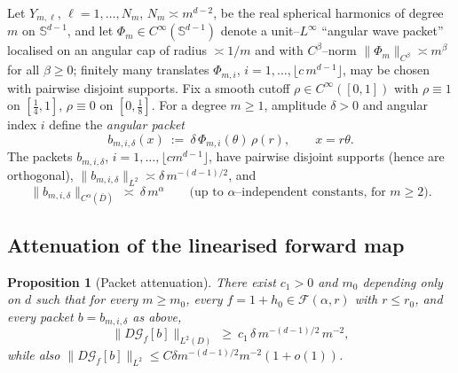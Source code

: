 \documentclass[11pt]{article}
\newtheorem{proposition}[theorem]{Proposition}
\newcommand{\1}{\mathbf{1}}
\newcommand{\norm}[1]{\lVert #1\rVert}
\newcommand{\Gf}{\mathcal{G}}
\newcommand{\F}{\mathcal{F}}
\begin{document}
Let $Y_{m,\ell}$, $\ell=1,\dots,N_m$, $N_m\asymp m^{d-2}$, be the real spherical
harmonics of degree $m$ on $\mathbb S^{d-1}$, and let
$\Phi_m\in C^\infty(\mathbb S^{d-1})$ denote a unit--$L^\infty$ ``angular wave packet''
localised on an angular cap of radius $\asymp 1/m$ and with $C^\beta$--norm
$\norm{\Phi_m}_{C^\beta}\asymp m^{\beta}$ for all $\beta\ge 0$; finitely many
translates $\Phi_{m,i}$, $i=1,\dots,\lfloor c\,m^{d-1}\rfloor$, may be chosen with
pairwise disjoint supports. Fix a smooth cutoff
$\rho\in C^\infty([0,1])$ with $\rho\equiv1$ on $[\tfrac14,1]$, $\rho\equiv0$ on
$[0,\tfrac18]$. For a degree $m\ge 1$, amplitude $\delta>0$ and angular index $i$
define the \emph{angular packet}
\begin{equation}\label{eq:packet}
b_{m,i,\delta}(x)\ :=\ \delta\,\Phi_{m,i}(\theta)\,\rho(r),\qquad x=r\theta .
\end{equation}
The packets $b_{m,i,\delta}$, $i=1,\dots,\lfloor cm^{d-1}\rfloor$, have pairwise
disjoint supports (hence are orthogonal), $\norm{b_{m,i,\delta}}_{L^2}\asymp
\delta\,m^{-(d-1)/2}$, and
\begin{equation}\label{eq:holderpacket}
\norm{b_{m,i,\delta}}_{C^\alpha(\bar D)}\ \asymp\ \delta\,m^{\alpha}
\qquad\text{(up to $\alpha$--independent constants, for $m\ge 2$).}
\end{equation}

\subsection{Attenuation of the linearised forward map}

\begin{proposition}[Packet attenuation]\label{prop:attenuation}
There exist $c_1>0$ and $m_0$ depending only on $d$ such that for every $m\ge m_0$,
every $f=1+h_0\in\F(\alpha,r)$ with $r\le r_0$, and every packet
$b=b_{m,i,\delta}$ as above,
\begin{equation}\label{eq:att}
\norm{D\Gf_f[b]}_{L^2(D)}\ \ge\ c_1\,\delta\,m^{-(d-1)/2}\,m^{-2},
\end{equation}
while also $\norm{D\Gf_f[b]}_{L^2}\le C\delta m^{-(d-1)/2}m^{-2}(1+o(1))$.
\end{proposition}
\end{document}
